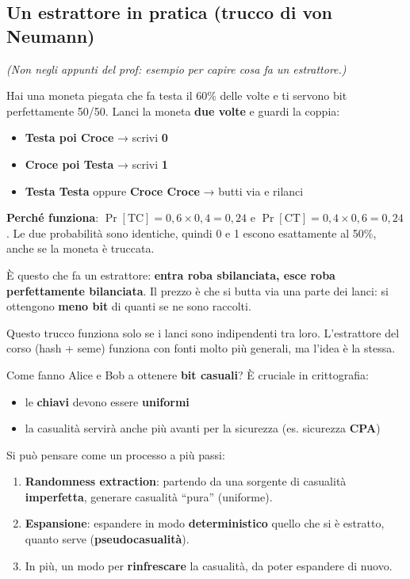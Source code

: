 \subsection{Un estrattore in pratica (trucco di von Neumann)}

\emph{(Non negli appunti del prof: esempio per capire cosa fa un estrattore.)}

Hai una moneta piegata che fa testa il 60\% delle volte e ti servono bit perfettamente 50/50. Lanci la moneta \textbf{due volte} e guardi la coppia:

\begin{itemize}
\tightlist
\item
  \textbf{Testa poi Croce} → scrivi \textbf{0}
\item
  \textbf{Croce poi Testa} → scrivi \textbf{1}
\item
  \textbf{Testa Testa} oppure \textbf{Croce Croce} → butti via e rilanci
\end{itemize}

\textbf{Perché funziona}: \(\Pr[\text{TC}] = 0{,}6 \times 0{,}4 = 0{,}24\) e \(\Pr[\text{CT}] = 0{,}4 \times 0{,}6 = 0{,}24\). Le due probabilità sono identiche, quindi 0 e 1 escono esattamente al 50\%, anche se la moneta è truccata.

È questo che fa un estrattore: \textbf{entra roba sbilanciata, esce roba perfettamente bilanciata}. Il prezzo è che si butta via una parte dei lanci: si ottengono \textbf{meno bit} di quanti se ne sono raccolti.

\begin{nota}

Questo trucco funziona solo se i lanci sono indipendenti tra loro. L'estrattore del corso (hash + seme) funziona con fonti molto più generali, ma l'idea è la stessa.

\end{nota}

Come fanno Alice e Bob a ottenere \textbf{bit casuali}? È cruciale in crittografia:

\begin{itemize}
\tightlist
\item
  le \textbf{chiavi} devono essere \textbf{uniformi}
\item
  la casualità servirà anche più avanti per la sicurezza (es. sicurezza \textbf{CPA})
\end{itemize}

Si può pensare come un processo a più passi:

\begin{enumerate}
\def\labelenumi{\arabic{enumi}.}
\tightlist
\item
  \textbf{Randomness extraction}: partendo da una sorgente di casualità \textbf{imperfetta}, generare casualità ``pura'' (uniforme).
\item
  \textbf{Espansione}: espandere in modo \textbf{deterministico} quello che si è estratto, quanto serve (\textbf{pseudocasualità}).
\item
  In più, un modo per \textbf{rinfrescare} la casualità, da poter espandere di nuovo.
\end{enumerate}

